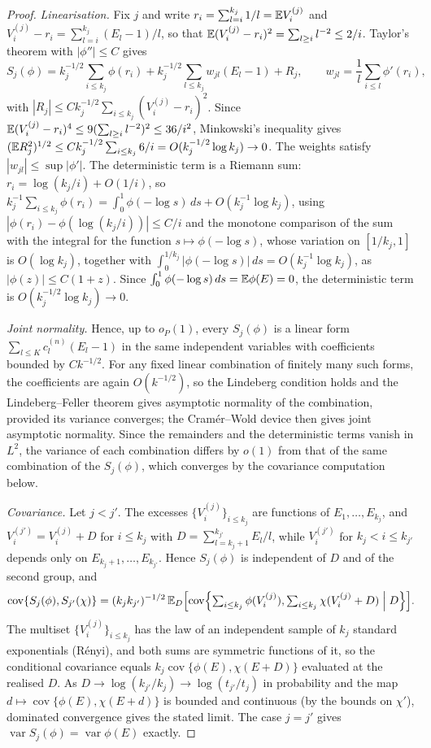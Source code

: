 \begin{proof}
\emph{Linearisation.} Fix $j$ and write $r_i=\sum_{l=i}^{k_j}1/l=\mathbb{E} V^{(j)}_i$ and
$V^{(j)}_i-r_i=\sum_{l=i}^{k_j}(E_l-1)/l$, so that $\mathbb{E}(V^{(j)}_i-r_i)^2=\sum_{l\ge i}l^{-2}\le2/i$.
Taylor's theorem with $|\phi''|\le C$ gives
\[
S_j(\phi)=k_j^{-1/2}\sum_{i\le k_j}\phi(r_i)+k_j^{-1/2}\sum_{l\le k_j}w_{jl}(E_l-1)+R_j,\qquad
w_{jl}=\frac1l\sum_{i\le l}\phi'(r_i),
\]
with $|R_j|\le Ck_j^{-1/2}\sum_{i\le k_j}(V^{(j)}_i-r_i)^2$. Since
$\mathbb{E}(V^{(j)}_i-r_i)^4\le9(\sum_{l\ge i}l^{-2})^2\le36/i^2$, Minkowski's inequality gives
$(\mathbb{E} R_j^2)^{1/2}\le Ck_j^{-1/2}\sum_{i\le k_j}6/i=O(k_j^{-1/2}\log k_j)\to0$. The weights satisfy
$|w_{jl}|\le\sup|\phi'|$. The deterministic term is a Riemann sum: $r_i=\log(k_j/i)+O(1/i)$,
so $k_j^{-1}\sum_{i\le k_j}\phi(r_i)=\int_0^1\phi(-\log s)\,ds+O(k_j^{-1}\log k_j)$, using
$|\phi(r_i)-\phi(\log(k_j/i))|\le C/i$ and the monotone comparison of the sum with the integral
for the function $s\mapsto\phi(-\log s)$, whose variation on $[1/k_j,1]$ is $O(\log k_j)$, together with
$\int_0^{1/k_j}|\phi(-\log s)|\,ds=O(k_j^{-1}\log k_j)$, as $|\phi(z)|\le C(1+z)$. Since
$\int_0^1\phi(-\log s)\,ds=\mathbb{E}\phi(E)=0$, the deterministic term is $O(k_j^{-1/2}\log k_j)\to0$.

\emph{Joint normality.} Hence, up to $o_P(1)$, every $S_j(\phi)$ is a linear form
$\sum_{l\le K}c^{(n)}_{l}(E_l-1)$ in the same independent variables with coefficients bounded by
$C k^{-1/2}$. For any fixed linear combination of finitely many such forms, the coefficients are
again $O(k^{-1/2})$, so the Lindeberg condition holds and the Lindeberg--Feller theorem gives
asymptotic normality of the combination, provided its variance converges; the Cram\'er--Wold
device then gives joint asymptotic normality. Since the remainders and the deterministic terms
vanish in $L^2$, the variance of each combination differs by $o(1)$ from that of the same
combination of the $S_j(\phi)$, which converges by the covariance computation below.

\emph{Covariance.} Let $j<j'$. The excesses $\{V^{(j)}_i\}_{i\le k_j}$ are functions of
$E_1,\dots,E_{k_j}$, and $V^{(j')}_i=V^{(j)}_i+D$ for $i\le k_j$ with $D=\sum_{l=k_j+1}^{k_{j'}}E_l/l$,
while $V^{(j')}_i$ for $k_j<i\le k_{j'}$ depends only on $E_{k_j+1},\dots,E_{k_{j'}}$. Hence
$S_j(\phi)$ is independent of $D$ and of the second group, and
\[
\operatorname{cov}\{S_j(\phi),S_{j'}(\chi)\}=(k_jk_{j'})^{-1/2}\,\mathbb{E}_D\Bigl[\operatorname{cov}\Bigl\{\textstyle\sum_{i\le k_j}\phi(V^{(j)}_i),\sum_{i\le k_j}\chi(V^{(j)}_i+D)\Bigm|D\Bigr\}\Bigr].
\]
The multiset $\{V^{(j)}_i\}_{i\le k_j}$ has the law of an independent sample of $k_j$ standard
exponentials (R\'enyi), and both sums are symmetric functions of it, so the conditional
covariance equals $k_j\operatorname{cov}\{\phi(E),\chi(E+D)\}$ evaluated at the realised $D$. As
$D\to\log(k_{j'}/k_j)\to\log(t_{j'}/t_j)$ in probability and the map
$d\mapsto\operatorname{cov}\{\phi(E),\chi(E+d)\}$ is bounded and continuous (by the bounds on
$\chi'$), dominated convergence gives the stated limit. The case $j=j'$ gives
$\operatorname{var}S_j(\phi)=\operatorname{var}\phi(E)$ exactly. \qedhere
\end{proof}

